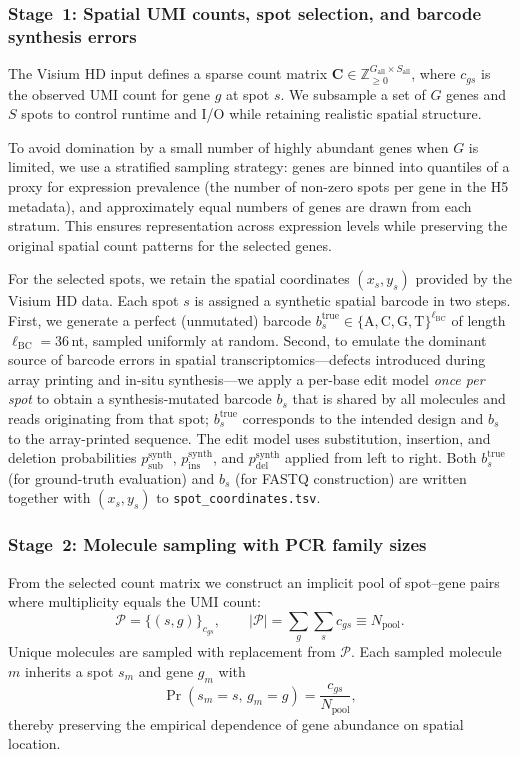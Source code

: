 \subsubsection*{Stage~1: Spatial UMI counts, spot selection, and barcode synthesis errors}

The Visium HD input defines a sparse count matrix
$\mathbf{C} \in \mathbb{Z}_{\ge 0}^{G_{\mathrm{all}} \times S_{\mathrm{all}}}$,
where $c_{gs}$ is the observed UMI count for gene $g$ at spot $s$.
We subsample a set of $G$ genes and $S$ spots to control runtime and I/O
while retaining realistic spatial structure.

To avoid domination by a small number of highly abundant genes when $G$ is limited, we use a stratified sampling strategy: genes are binned into quantiles of a proxy for expression prevalence (the number of non-zero spots per gene in the H5 metadata), and approximately equal numbers of genes are drawn from each stratum. This ensures representation across expression levels while preserving the original spatial count patterns for the selected genes.

For the selected spots, we retain the spatial coordinates $(x_s,y_s)$ provided by the Visium HD data. Each spot $s$ is assigned a synthetic spatial barcode in two steps. First, we generate a perfect (unmutated) barcode $b_s^{\mathrm{true}} \in \{\mathrm{A,C,G,T}\}^{\ell_{\mathrm{BC}}}$ of length $\ell_{\mathrm{BC}}=36$\,nt, sampled uniformly at random. Second, to emulate the dominant source of barcode errors in spatial transcriptomics---defects introduced during array printing and in-situ synthesis---we apply a per-base edit model \emph{once per spot} to obtain a synthesis-mutated barcode $b_s$ that is shared by all molecules and reads originating from that spot; $b_s^{\mathrm{true}}$ corresponds to the intended design and $b_s$ to the array-printed sequence. The edit model uses substitution, insertion, and deletion probabilities $p_{\mathrm{sub}}^{\mathrm{synth}}$, $p_{\mathrm{ins}}^{\mathrm{synth}}$, and $p_{\mathrm{del}}^{\mathrm{synth}}$ applied from left to right. Both $b_s^{\mathrm{true}}$ (for ground-truth evaluation) and $b_s$ (for FASTQ construction) are written together with $(x_s,y_s)$ to \texttt{spot\_coordinates.tsv}.

\subsubsection*{Stage~2: Molecule sampling with PCR family sizes}

From the selected count matrix we construct an implicit pool of spot--gene pairs where multiplicity equals the UMI count:
\begin{equation}
\mathcal{P} = \bigl\{(s,g)\bigr\}_{c_{gs}},
\qquad
|\mathcal{P}| = \sum_{g}\sum_{s} c_{gs} \equiv N_{\mathrm{pool}}.
\end{equation}
Unique molecules are sampled with replacement from $\mathcal{P}$.
Each sampled molecule $m$ inherits a spot $s_m$ and gene $g_m$ with
\begin{equation}
\Pr(s_m=s,\,g_m=g) = \frac{c_{gs}}{N_{\mathrm{pool}}},
\end{equation}
thereby preserving the empirical dependence of gene abundance on spatial location.

